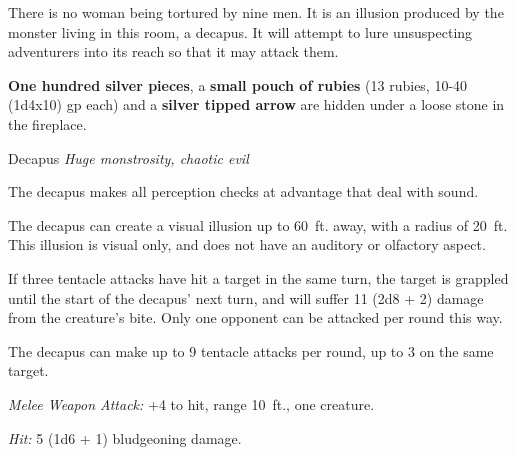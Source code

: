 \documentclass[palace_of_the_silver_princess]{subfiles}
\begin{document}
There is no woman being tortured by nine men. It is an illusion produced
by the monster living in this room, a decapus.  It will attempt to lure
unsuspecting adventurers into its reach so that it may attack them. 

\textbf{One hundred silver pieces}, a \textbf{small pouch of rubies} (13
rubies, 10-40 (1d4x10) gp each) and a \textbf{silver tipped arrow} are
hidden under a loose stone in the fireplace.

\begin{monsterbox}{Decapus}
	\textit{Huge monstrosity, chaotic evil}\\
	\hline
	\basics[
		armorclass = {12},
		hitpoints = {59 (7d12 + 15)},
		speed = {50~ft., climb 25~ft.}]
	\hline
	\stats[
		STR = \stat{10},
		DEX = \stat{15},
		CON = \stat{10},
		INT = \stat{7},
		WIS = \stat{10},
		CHA = \stat{9}]
	\hline
	\details[
		senses = {darkvision 60~ft.passive Perception 10},
		languages = {decapus},
		challenge = {2 (450 XP)}]
	\hline
	\begin{monsteraction}
        The decapus makes all perception checks at advantage that deal
        with sound.
	\end{monsteraction}

    \begin{monsteraction}
        The decapus can create a visual illusion up to 60~ft. away, with
        a radius of 20~ft.  This illusion is visual only, and does not
        have an auditory or olfactory aspect.
    \end{monsteraction}

    \begin{monsteraction}[Rend]
        If three tentacle attacks have hit a target in the same turn,
        the target is grappled until the start of the decapus' next
        turn, and will suffer 11 (2d8 + 2) damage from the creature's
        bite.  Only one opponent can be attacked per round this way.
    \end{monsteraction}

    \begin{monsteraction}
        The decapus can make up to 9 tentacle attacks per round, up to 3
        on the same target.
	\end{monsteraction}

    \begin{monsteraction}[Tentacle]
		\textit{Melee Weapon Attack:} +4 to hit, range 10~ft., one
        creature.

        \textit{Hit:} 5 (1d6 + 1) bludgeoning damage.
	\end{monsteraction}
\end{monsterbox}
\end{document}
